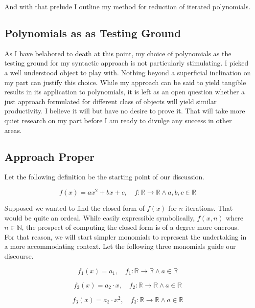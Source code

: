 And with that prelude I outline my method for reduction of iterated
polynomials.

\subsection{Polynomials as as Testing Ground}
As I have belabored to death at this point, my choice of polynomials as the
testing ground for my syntactic approach is not particularly stimulating. I
picked a well understood object to play with. Nothing beyond a superficial
inclination on my part can justify this choice. While my approach can be said
to yield tangible results in its application to polynomials, it is left as an
open question whether a just approach formulated for different class of objects
will yield similar productivity. I believe it will but have no desire to prove
it. That will take more quiet research on my part before I am ready to divulge
any success in other areas.

\subsection{Approach Proper}
Let the following definition be the starting point of our discussion.

\begin{equation}
    f(x)=ax^2 + bx + c, \quad f: \mathbb{R} \rightarrow \mathbb{R} \land a,b,c \in \mathbb{R}
\end{equation}

Supposed we wanted to find the closed form of $f(x)$ for $n$ iterations. That
would be quite an ordeal. While easily expressible symbolically, $f(x,n)$ where
$n \in \mathbb{N}$, the prospect of computing the closed form is of a degree
more onerous. For that reason, we will start simpler monomials to represent the
undertaking in a more accommodating context. Let the following three monomials
guide our discourse.

\begin{equation}
    f_1(x) = a_1, \quad f_1: \mathbb{R} \rightarrow \mathbb{R} \land a \in \mathbb{R}
\end{equation}

\begin{equation}
    f_2(x) = a_2 \cdot x, \quad f_2: \mathbb{R} \rightarrow \mathbb{R} \land a \in \mathbb{R}
\end{equation}

\begin{equation}
    f_3(x) = a_3 \cdot x^2, \quad f_3: \mathbb{R} \rightarrow \mathbb{R} \land a \in \mathbb{R}
\end{equation}

